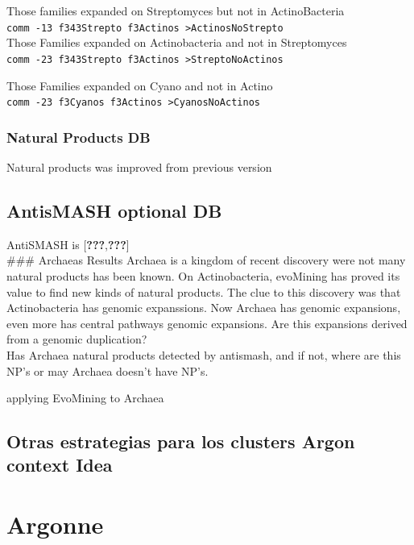 \documentclass[12pt,twoside]{reedthesis}
\begin{document}
  Those families expanded on Streptomyces but not in ActinoBacteria\\
  \texttt{comm\ -13\ f343Strepto\ f3Actinos\ \textgreater{}ActinosNoStrepto}\\
  Those Families expanded on Actinobacteria and not in Streptomyces\\
  \texttt{comm\ -23\ f343Strepto\ f3Actinos\ \textgreater{}StreptoNoActinos}
  
  Those Families expanded on Cyano and not in Actino\\
  \texttt{comm\ -23\ f3Cyanos\ f3Actinos\ \textgreater{}CyanosNoActinos}
  
  \subsubsection{Natural Products DB}\label{natural-products-db}
  
  Natural products was improved from previous version
  
  \subsection{AntisMASH optional DB}\label{antismash-optional-db}
  
  AntiSMASH is {[}{\textbf{???}},\textbf{???}{]}\\
  \#\#\# Archaeas Results Archaea is a kingdom of recent discovery were
  not many natural products has been known. On Actinobacteria, evoMining
  has proved its value to find new kinds of natural products. The clue to
  this discovery was that Actinobacteria has genomic expanssions. Now
  Archaea has genomic expansions, even more has central pathways genomic
  expansions. Are this expansions derived from a genomic duplication?\\
  Has Archaea natural products detected by antismash, and if not, where
  are this NP's or may Archaea doesn't have NP's.
  
  applying EvoMining to Archaea
  
  \subsection{Otras estrategias para los clusters Argon context
  Idea}\label{otras-estrategias-para-los-clusters-argon-context-idea}
  
  \section{Argonne}\label{argonne}
  
\end{document}
